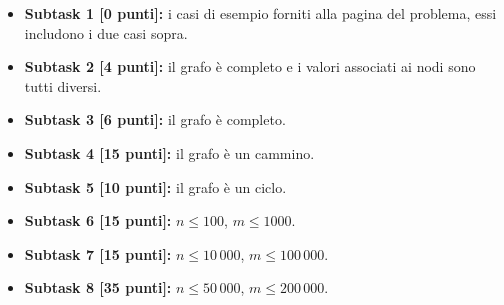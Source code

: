   \begin{itemize}
    \item \textbf{Subtask 1 [0 punti]:} i casi di esempio forniti alla pagina del problema, essi includono i due casi sopra.
    \item \textbf{Subtask 2 [4 punti]:} il grafo è completo e i valori associati ai nodi sono tutti diversi.
    \item \textbf{Subtask 3 [6 punti]:} il grafo è completo.
    \item \textbf{Subtask 4 [15 punti]:} il grafo è un cammino.
    \item \textbf{Subtask 5 [10 punti]:} il grafo è un ciclo.
    \item \textbf{Subtask 6 [15 punti]:} $n \le 100$, $m \le 1000$.
    \item \textbf{Subtask 7 [15 punti]:} $n \le 10\,000$, $m \le 100\,000$.
    \item \textbf{Subtask 8 [35 punti]:} $n \le 50\,000$, $m \le 200\,000$.
  \end{itemize}
  
